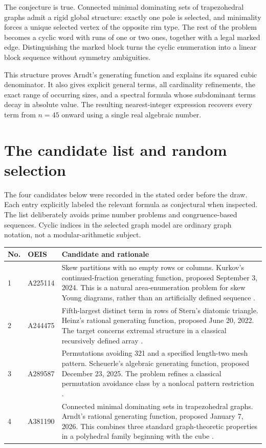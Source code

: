 \documentclass[11pt,letterpaper]{article}
\numberwithin{equation}{section}
\theoremstyle{definition}
\theoremstyle{remark}
\begin{document}
The conjecture is true. Connected minimal dominating sets of
trapezohedral graphs admit a rigid global structure: exactly one
pole is selected, and minimality forces a unique selected vertex
of the opposite rim type. The rest of the problem becomes a
cyclic word with runs of one or two ones, together with a legal
marked edge. Distinguishing the marked block turns the cyclic
enumeration into a linear block sequence without symmetry
ambiguities.

This structure proves Arndt's generating function and explains its
squared cubic denominator. It also gives explicit general terms,
all cardinality refinements, the exact range of occurring sizes,
and a spectral formula whose subdominant terms decay in absolute
value. The resulting nearest-integer expression recovers every
term from $n=45$ onward using a single real algebraic number.

\appendix
\section{The candidate list and random selection}\label{sec:selection}

The four candidates below were recorded in the stated order before
the draw. Each entry explicitly labeled the relevant formula as
conjectural when inspected. The list deliberately avoids prime
number problems and congruence-based sequences. Cyclic indices in
the selected graph model are ordinary graph notation, not a
modular-arithmetic subject.

\begin{longtable}{@{}p{}p{}p{}@{}}
\toprule
No. & OEIS & Candidate and rationale\\
\midrule
\endhead
1 & A225114 & Skew partitions with no empty rows or columns.
Kurkov's continued-fraction generating function, proposed September
3, 2024. This is a natural area-enumeration problem for skew Young
diagrams, rather than an artificially defined sequence
\cite{oeis225114}.\\[0.5em]
2 & A244475 & Fifth-largest distinct term in rows of Stern's diatomic
triangle. Heinz's rational generating function, proposed June 20,
2022. The target concerns extremal structure in a classical
recursively defined array \cite{oeis244475}.\\[0.5em]
3 & A289587 & Permutations avoiding 321 and a specified length-two
mesh pattern. Scheuerle's algebraic generating function, proposed
December 23, 2025. The problem refines a classical permutation
avoidance class by a nonlocal pattern restriction
\cite{oeis289587}.\\[0.5em]
4 & A381190 & Connected minimal dominating sets in trapezohedral
graphs. Arndt's rational generating function, proposed January 7,
2026. This combines three standard graph-theoretic properties in
a polyhedral family beginning with the cube
\cite{oeis381190,trapezohedral}.\\
\bottomrule
\end{longtable}
\end{document}
